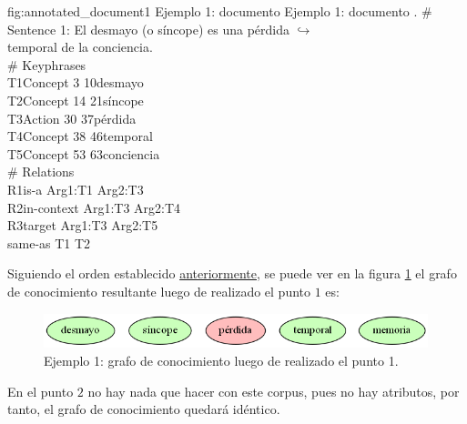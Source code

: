 \begin{annexample}
[backgroundcolor=cyan!13]
{\textwidth}
{fig:annotated_document1}
{Ejemplo 1: documento }
{Ejemplo 1: documento .}
	\# Sentence 1: El desmayo (o síncope) es una pérdida {\scriptsize $\hookrightarrow$}\\
	temporal de la conciencia.\\
	\# Keyphrases\\
	T1\space\space Concept 3 10\space\space\space\space desmayo\\
	T2\space\space Concept 14 21\space\space\space síncope\\
	T3\space\space Action 30 37\space\space\space\space pérdida\\
	T4\space\space Concept 38 46\space\space\space temporal\\
	T5\space\space Concept 53 63\space\space\space conciencia\\
	\# Relations\\
	R1\space\space is-a Arg1:T1 Arg2:T3\\
	R2\space\space in-context Arg1:T3 Arg2:T4\\
	R3\space\space target Arg1:T3 Arg2:T5\\
	\textasteriskcentered\space\space\space same-as T1 T2
\end{annexample}

Siguiendo el orden establecido \hyperref[enum:knowledge_graph_build_order]{anteriormente}, se puede ver en la figura \ref{fig:knowledge_graph1.1} el grafo de conocimiento resultante luego de realizado el punto $1$ es:

\begin{figure}[H]
	\begin{center}
		\includegraphics[width=4.4in]{graphics/knowledge_graph_example1_1.png}
		\caption[Ejemplo 1: grafo de conocimiento luego de realizado el punto 1]{Ejemplo 1: grafo de conocimiento luego de realizado el punto 1.}
		\label{fig:knowledge_graph1.1}
	\end{center}
\end{figure}

En el punto $2$ no hay nada que hacer con este corpus, pues no hay atributos, por tanto, el grafo de conocimiento quedará idéntico.

